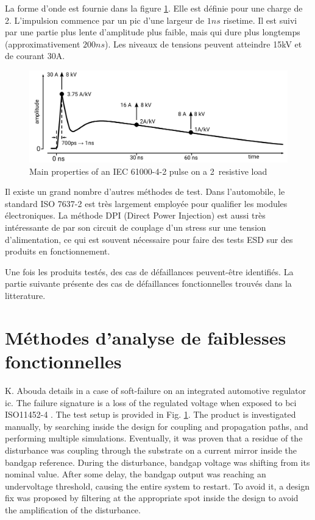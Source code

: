 La forme d'onde est fournie dans la figure \ref{iec_pulse}.
Elle est définie pour une charge de 2\textOmega{}.
L'impulsion commence par un pic d'une largeur de $1ns$ risetime.
Il est suivi par une partie plus lente d'amplitude plus faible, mais qui dure plus longtemps (approximativement $200ns$).
Les niveaux de tensions peuvent atteindre 15kV et de courant 30A.

\begin{figure}[!h]
  \centering
  \includegraphics[width=\textwidth]{src/1/figures/iec61000-4-2_waveform.pdf}
  \caption{Main properties of an IEC 61000-4-2 pulse on a 2\textOmega\ resistive load}
  \label{iec_pulse}
\end{figure}

Il existe un grand nombre d'autres méthodes de test.
Dans l'automobile, le standard ISO 7637-2 est très largement employée pour qualifier les modules électroniques.
La méthode DPI (Direct Power Injection) est aussi très intéressante de par son circuit de couplage d'un stress sur une tension d'alimentation, ce qui est souvent nécessaire pour faire des tests ESD sur des produits en fonctionnement.

Une fois les produits testés, des cas de défaillances peuvent-être identifiés.
La partie suivante présente des cas de défaillances fonctionnelles trouvés dans la litterature.

\section{Méthodes d'analyse de faiblesses fonctionnelles}

K. Abouda details in \cite{softfailEMCIC} a case of soft-failure on an integrated automotive regulator \gls{ic}.
The failure signature is a loss of the regulated voltage when exposed to \gls{bci} ISO11452-4 \cite{iso11452}.
The test setup is provided in Fig. \ref{}.
The product is investigated manually, by searching inside the design for coupling and propagation paths, and performing multiple simulations.
Eventually, it was proven that a residue of the disturbance was coupling through the substrate on a current mirror inside the bandgap reference.
During the disturbance, bandgap voltage was shifting from its nominal value.
After some delay, the bandgap output was reaching an undervoltage threshold, causing the entire system to restart.
To avoid it, a design fix was proposed by filtering at the appropriate spot inside the design to avoid the amplification of the disturbance.

